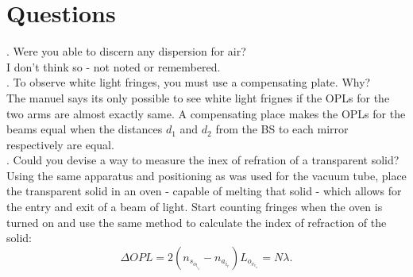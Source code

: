 \documentclass[12pt]{article}
\begin{document}
\section{Questions}
\indent {}. Were you able to discern any dispersion for air? \\
\indent I don't think so - not noted or remembered. \\
. To observe white light fringes, you must use a compensating plate. Why? \\
\indent The manuel says its only possible to see white light frignes if the OPLs for the two arms are almost exactly same. A compensating place makes the OPLs for the beams equal when the distances $d_1$ and $d_2$ from the BS to each mirror respectively are equal. \\
. Could you devise a way to measure the inex of refration of a transparent solid? \\
\indent Using the same apparatus and positioning as was used for the vacuum tube, place the transparent solid in an oven - capable of melting that solid - which allows for the entry and exit of a beam of light. Start counting fringes when the oven is turned on and use the same method to calculate the index of refraction of the solid:
\[ \Delta OPL = 2(n_s_o_l_i_d - n_a_i_r)L_o_v_e_n = N\lambda . \]
\end{document}
